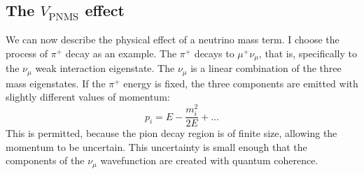 \documentclass[../../main/main.tex]{subfiles}
\begin{document}
\subsection{The \( V_{\mathrm{PNMS}} \) effect}
We can now describe the physical effect of a neutrino mass term. I choose the process of \( \pi^+ \) decay as an example. The \( \pi^+ \) decays to \( \mu^+\nu_{\mu} \), that is, specifically to the \( \nu_{\mu} \) weak interaction eigenstate. The \( \nu_{\mu} \) is a linear combination of the three mass eigenstates. If the \( \pi^+ \) energy is fixed, the three components are emitted with slightly different values of momentum:
\begin{equation}
	p_i
	=
	E - \frac{m^2_i}{2E} + \dots
	\label{eq:}
\end{equation}
This is permitted, because the pion decay region is of finite size, allowing the momentum to be uncertain. This uncertainty is small enough that the components of the \( \nu_{\mu} \) wavefunction are created with quantum coherence.
\end{document}
